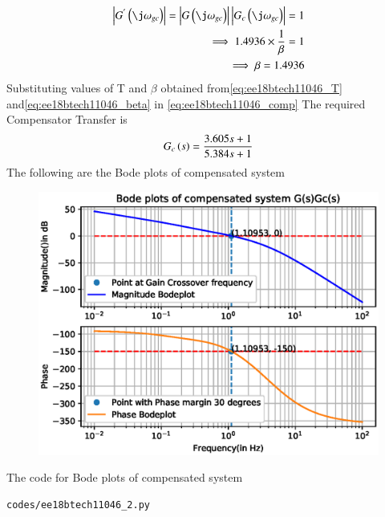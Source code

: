 \begin{enumerate}[label=\thesection.\arabic*.,ref=\thesection.\theenumi]
\begin{align}
\abs{G^{'}\brak{\j\omega_{gc}}} = \abs{G\brak{\j\omega_{gc}}}\abs{G_{c}\brak{\j\omega_{gc}}} = 1
\\
\implies
1.4936 \times \frac{1}{\beta} = 1
\\
\implies
\beta = 1.4936
\label{eq:ee18btech11046_beta}
\end{align} 
Substituting values of T and $\beta$ obtained from\eqref{eq:ee18btech11046_T} and\eqref{eq:ee18btech11046_beta} in \eqref{eq:ee18btech11046_comp}
The required Compensator Transfer is
\begin{align}
G_{c}\left(s\right) = \frac{3.605s+1}{5.384s+1}
\end{align}
The following are the Bode plots of compensated system
\begin{figure}[!h]
\centering
  \includegraphics[width=\columnwidth]{./figs/ee18btech11046_2.eps}
\caption{}
\label{fig:ee18btech11046_compensated} 
\end{figure}
%

The code for Bode plots of compensated system 
\begin{lstlisting}
codes/ee18btech11046_2.py
\end{lstlisting}
% 

\end{enumerate}

